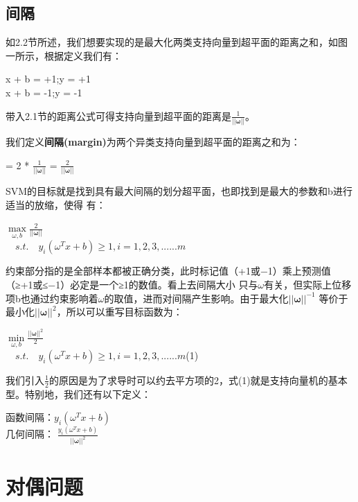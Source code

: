 \documentclass[UTF8]{ctexart}
\begin{document}
{\subsection{间隔}
如2.2节所述，我们想要实现的是最大化两类支持向量到超平面的距离之和，如图一所示，根据定义我们有：
\begin{center}
    {
        \Large
        { 
            x + b = +1;y = +1\\[3ex]
            x + b = -1;y = -1
        }
    }
\end{center}
带入2.1节的距离公式可得支持向量到超平面的距离是$\frac{1}{\bm||\bm{\omega}||}$。\par
我们定义\textbf{间隔(margin)}为两个异类支持向量到超平面的距离之和为：\par
\begin{center}
    \Large \bm{$\gamma$} = 2 * $\frac{1}{\bm||\bm{\omega}||}$ = $\frac{2}{\bm||\bm{\omega}||}$\\[2ex]
\end{center}
SVM的目标就是找到具有最大间隔的划分超平面，也即找到是\bm{$\gamma$}最大的参数\bm{$\omega$}和b进行适当的放缩，使得
有：\par
\begin{center}
    \Large{
        $\max\limits_{\omega,b}$$\frac{2}{||\bm{\omega}||}$\\[1ex]
        $\quad s.t.\quad y_i(\omega^Tx+b)\geq1,i=1,2,3,......m$
        }
\end{center}
约束部分指的是全部样本都被正确分类，此时标记值（+1或−1）乘上预测值（≥+1或≤−1）必定是一个≥1的数值。看上去间隔大小
只与$\omega$有关，但实际上位移项b也通过约束影响着$\omega$的取值，进而对间隔产生影响。由于最大化$||\bm{\omega}||^{-1}$
等价于最小化$||\bm{\omega}||^2$，所以可以重写目标函数为：\par
\begin{center}
    \Large{
        $\min\limits_{\omega,b}$$\frac{||\bm{\omega}||^2}{2}$\\[2ex]
        $\quad s.t.\quad y_i(\omega^Tx+b)\geq1,i=1,2,3,......m$(1)
    }
\end{center} 
我们引入$\frac{1}{2}$的原因是为了求导时可以约去平方项的2，式(1)就是支持向量机的基本型。特别地，我们还有以下定义：\par
\begin{center}
    函数间隔：$y_i(\omega^Tx+b)$\\[3ex]
    几何间隔：\Large{
        $\frac{y_i(\omega^Tx+b)}{||\bm{\omega}||^2}$
    }
\end{center}\newpage
\section{对偶问题}
}
\end{document}
